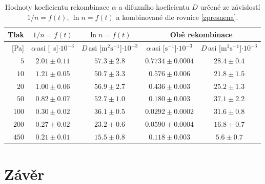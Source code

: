 \documentclass[a4paper,12pt]{article}
\begin{document}
\begin{table}[h]
	\caption{Hodnoty koeficientu rekombinace $\alpha$ a difuzního koeficientu 
	$D$ určené ze závislostí $1/n = f(t)$, $\ln n = f(t)$ a kombinované dle 
	rovnice \eqref{zpresnena}.}
	\label{table:koef}
	\begin{tabular}{|r|c|c|c|c|}
		\hline
		Tlak    & $1/n = f(t)$      & $\ln n = f(t)$ & 
		\multicolumn{2}{c|}{Obě rekombinace}                                \\ 
		\hline
		{[}Pa{]} & 
		$\alpha$\,asi [\si{\per\second}]$\cdot10^{-3}$ & 
		$D$\,asi 
		[$\si{\metre^2\second^{-1}}$]$\cdot10^{-3}$              & 
		$\alpha$\,asi [$\si{\second^{-1}}$]$\cdot10^{-3}$ & 
		$D$\,asi [$\si{\metre^2\second^{-1}}$]$\cdot10^{-3}$ \\ 
		\hline
		$5$                              &$ 2.01                 \pm 
		0.11                $&$ 57.3              \pm  2.8              $& 
		$0.7734    
		\pm 0.0004    $&$ 28.4       \pm  0.4       $\\ \hline
		$10$                             & $1.21                 \pm  
		0.05                $&$ 50.7              \pm  3.3              $&$ 
		0.576     
		\pm 0.006     $&$ 21.8       \pm  1.5       $\\ \hline
		$20                             $&$ 1.00                 \pm  
		0.06                $&$ 56.9              \pm  2.7              $&$ 
		0.436     
		\pm 0.003     $&$ 25.2       \pm  1.3       $\\ \hline
		$50                             $&$ 0.82                 \pm  
		0.07                $&$ 52.7              \pm  1.0              $&$ 
		0.180     
		\pm 0.003     $&$ 37.1       \pm  2.2       $\\ \hline
		$100                            $&$ 0.30                 \pm  
		0.02                $&$ 36.1              \pm  0.5              $& 
		$0.0292    
		\pm 0.0002    $&$ 31.6       \pm  0.8       $\\ \hline
		$200                            $&$ 0.27                 \pm  
		0.02                $&$ 23.2              \pm  0.6              $& 
		$0.0590    
		\pm 0.0004    $&$ 16.8       \pm  0.7       $\\ \hline
		$450                            $&$ 0.21                 \pm  
		0.01                $&$ 15.5              \pm  0.8              $& 
		$0.118     
		\pm 0.003     $&$ 5.6        \pm  0.7       $\\ \hline
	\end{tabular}
\end{table}
\clearpage
\section{Závěr}
\end{document}
